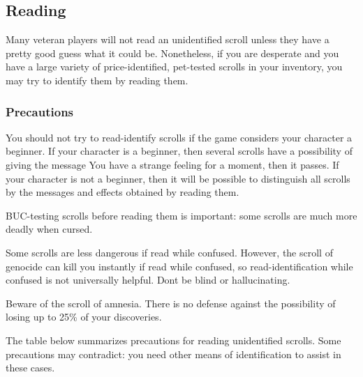 \subsection{Reading}
\label{10}
Many veteran players will not read an unidentified scroll unless they have a pretty good guess what it could be. Nonetheless, if you are desperate and you have a large variety of price-{}identified, pet-{}tested scrolls in your inventory, you may try to identify them by reading them.



\subsubsection{Precautions}
\label{11}
You should not try to read-{}identify scrolls if the game considers your character a beginner\footnotemark[99]. If your character is a beginner, then several scrolls have a possibility of giving the message You have a strange feeling for a moment, then it passes. If your character is not a beginner, then it will be possible to distinguish all scrolls by the messages and effects obtained by reading them.


BUC-{}testing scrolls before reading them is important: some scrolls are much more deadly when cursed.


Some scrolls are less dangerous if read while confused. However, the scroll of genocide\footnotemark[100] can kill you instantly if read while confused, so read-{}identification while confused is not universally helpful. Don\textquotesingle{}t be blind or hallucinating.


Beware of the scroll of amnesia. There is no defense against the possibility of losing up to 25\% of your discoveries.


The table below summarizes precautions for reading unidentified scrolls. Some precautions may contradict: you need other means of identification to assist in these cases.




